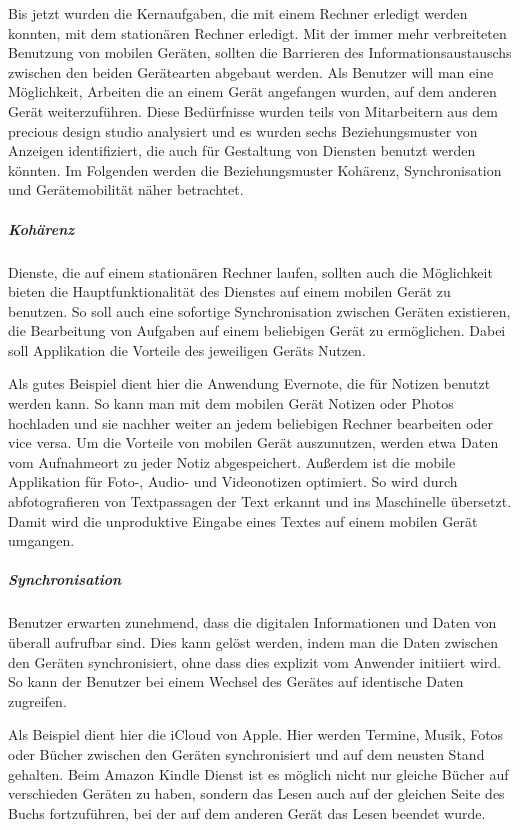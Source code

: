 Bis jetzt wurden die Kernaufgaben, die mit einem Rechner erledigt werden konnten, mit dem stationären Rechner erledigt. Mit der immer mehr verbreiteten Benutzung von mobilen Geräten, sollten die Barrieren des Informationsaustauschs zwischen den beiden Gerätearten abgebaut werden. Als Benutzer will man eine Möglichkeit, Arbeiten die an einem Gerät angefangen wurden, auf dem anderen Gerät weiterzuführen. Diese Bedürfnisse wurden teils von Mitarbeitern aus dem precious design studio analysiert und es wurden sechs Beziehungsmuster von Anzeigen identifiziert, die auch für Gestaltung von Diensten benutzt werden könnten\cite{slideEcosystems}. Im Folgenden werden die Beziehungsmuster Kohärenz, Synchronisation und Gerätemobilität näher betrachtet.

\subparagraph{Kohärenz}

Dienste, die auf einem stationären Rechner laufen, sollten auch die Möglichkeit bieten die Hauptfunktionalität des Dienstes auf einem mobilen Gerät zu benutzen. So soll auch eine sofortige Synchronisation zwischen Geräten existieren, die  Bearbeitung von Aufgaben auf einem beliebigen Gerät zu ermöglichen. Dabei soll Applikation die Vorteile des jeweiligen Geräts Nutzen.

Als gutes Beispiel dient hier die Anwendung Evernote, die für Notizen benutzt werden kann. So kann man mit dem mobilen Gerät Notizen oder Photos hochladen und sie nachher weiter an jedem beliebigen Rechner bearbeiten oder vice versa. Um die Vorteile von mobilen Gerät auszunutzen, werden etwa Daten vom Aufnahmeort zu jeder Notiz abgespeichert. Außerdem ist die mobile Applikation für Foto-, Audio- und Videonotizen optimiert. So wird durch abfotografieren von Textpassagen der Text erkannt und ins Maschinelle übersetzt. Damit wird die unproduktive Eingabe eines Textes auf einem mobilen Gerät umgangen.

\subparagraph{Synchronisation}

Benutzer erwarten zunehmend, dass die digitalen Informationen und Daten von überall aufrufbar sind. Dies kann gelöst werden, indem man die Daten zwischen den Geräten synchronisiert, ohne dass dies explizit vom Anwender initiiert wird. So kann der Benutzer bei einem Wechsel des Gerätes auf identische Daten zugreifen. 

Als Beispiel dient hier die iCloud von Apple. Hier werden Termine, Musik, Fotos oder Bücher zwischen den Geräten synchronisiert und auf dem neusten Stand gehalten. Beim Amazon Kindle Dienst ist es möglich nicht nur gleiche Bücher auf verschieden Geräten zu haben, sondern das Lesen auch auf der gleichen Seite des Buchs fortzuführen, bei der auf dem anderen Gerät das Lesen beendet wurde.

